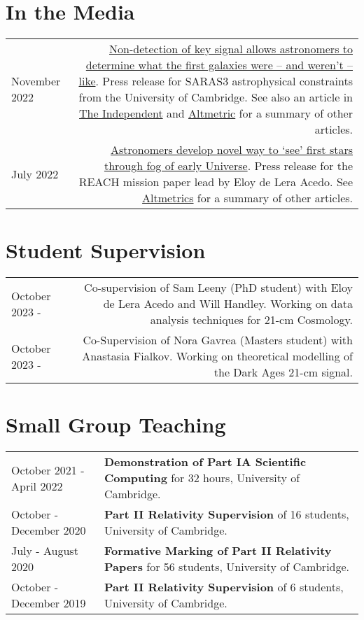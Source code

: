\documentclass{article}
\begin{document}
\section*{In the Media}

\begin{tabular}{L!{\vrule}R}
	November 2022 & \href{https://www.cam.ac.uk/research/news/non-detection-of-key-signal-allows-astronomers-to-determine-what-the-first-galaxies-were-and-werent}{Non-detection of key signal allows astronomers to determine what the first galaxies were – and weren’t – like}. Press release for SARAS3 astrophysical constraints from the University of Cambridge. See also an article in \href{https://www.independent.co.uk/space/galaxies-beginning-cosmic-dawn-signal-b2234570.html?amp}{The Independent} and \href{https://nature.altmetric.com/details/139089769/news}{Altmetric} for a summary of other articles. \\
	July 2022 & \href{https://www.cam.ac.uk/research/news/astronomers-develop-novel-way-to-see-the-first-stars-through-the-fog-of-the-early-universe}{Astronomers develop novel way to ‘see’ first stars through fog of early Universe}. Press release for the REACH mission paper lead by Eloy de Lera Acedo. See \href{https://nature.altmetric.com/details/132932581/news}{Altmetrics} for a summary of other articles.
\end{tabular}

\section*{Student Supervision}

\begin{tabular}{L!{\vrule}R}
	October 2023 - & Co-supervision of Sam Leeny (PhD student) with Eloy de Lera Acedo and Will Handley. Working on data analysis techniques for 21-cm Cosmology. \\
	October 2023 - & Co-Supervision of Nora Gavrea (Masters student) with Anastasia Fialkov. Working on theoretical modelling of the Dark Ages 21-cm signal. \\
\end{tabular}

\section*{Small Group Teaching}

\begin{tabular}{>{\raggedleft}p{}!{\vrule}p{0.76\textwidth}}
	October 2021 - April 2022 & \textbf{Demonstration of Part IA Scientific Computing} for 32 hours, University of Cambridge.\\
	October - December 2020 & \textbf{Part II Relativity Supervision} of 16 students,  University of Cambridge. \\
	July - August 2020 & \textbf{Formative Marking of Part II Relativity Papers} for 56 students, University of Cambridge. \\
	October - December 2019 & \textbf{Part II Relativity Supervision} of 6 students, University of Cambridge.
\end{tabular}
\end{document}
